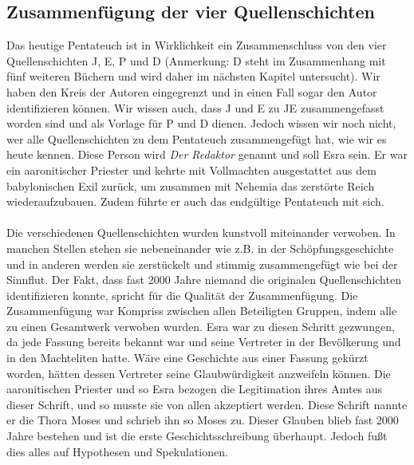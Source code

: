 \subsection*{Zusammenfügung der vier Quellenschichten}
Das heutige Pentateuch ist in Wirklichkeit ein Zusammenschluss von den vier Quellenschichten J, E, P und D (Anmerkung: D steht im Zusammenhang mit fünf weiteren Büchern und wird daher im nächsten Kapitel untersucht). Wir haben den Kreis der Autoren eingegrenzt und in einen Fall sogar den Autor identifizieren können. Wir wissen auch, dass J und E zu JE zusammengefasst worden sind und als Vorlage für P und D dienen. Jedoch wissen wir noch nicht, wer alle Quellenschichten zu dem Pentateuch zusammengefügt hat, wie wir es heute kennen. Diese Person wird \glqq\textit{Der Redaktor}\grqq{}  genannt und soll Esra sein. Er war ein aaronitischer Priester und kehrte mit Vollmachten ausgestattet aus dem babylonischen Exil zurück, um zusammen mit Nehemia das zerstörte Reich wiederaufzubauen.  Zudem führte er auch das endgültige Pentateuch mit sich.
\\~\\
Die verschiedenen Quellenschichten wurden kunstvoll miteinander verwoben. In manchen Stellen stehen sie nebeneinander wie z.B. in der Schöpfungsgeschichte und in anderen werden sie zerstückelt und stimmig zusammengefügt wie bei der Sinnflut. Der Fakt, dass fast 2000 Jahre niemand die originalen Quellenschichten identifizieren konnte, spricht für die Qualität der Zusammenfügung. Die Zusammenfügung war Kompriss zwischen allen Beteiligten Gruppen, indem alle zu einen Gesamtwerk verwoben wurden. Esra war zu diesen Schritt gezwungen, da jede Fassung bereits bekannt war und seine Vertreter in der Bevölkerung und in den Machteliten hatte. Wäre eine Geschichte aus einer Fassung gekürzt worden, hätten dessen Vertreter seine Glaubwürdigkeit anzweifeln können. Die aaronitischen Priester und so Esra bezogen die Legitimation ihres Amtes aus dieser Schrift, und so musste sie von allen akzeptiert werden. Diese Schrift nannte er die Thora Moses und schrieb ihn so Moses zu. Dieser Glauben blieb fast 2000 Jahre bestehen und ist die erste Geschichtsschreibung überhaupt. Jedoch fußt dies alles auf Hypothesen und Spekulationen.

